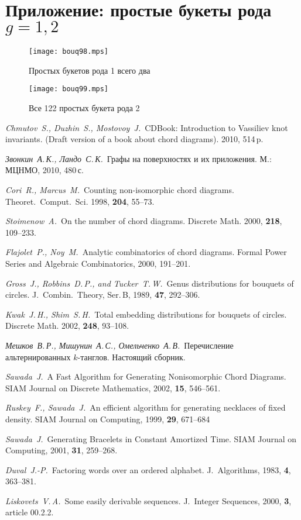 \documentclass[a4paper,12pt]{article}
\theoremstyle{plain}
\theoremstyle{definition}
\begin{document}
\section*{Приложение: простые букеты рода $g=1,2$}

\begin{figure}[ht]
\centering
\texttt{[image: bouq98.mps]}
\caption{\footnotesize Простых букетов рода 1 всего два\label{figure:simple1-table}}
\end{figure}

\begin{figure}[ht]
\centering
\texttt{[image: bouq99.mps]}
\caption{\footnotesize Все 122 простых букета рода 2\label{figure:simple2-table}}
\end{figure}

\begin{thebibliography}{88}
{\em Chmutov~S., Duzhin~S., Mostovoy~J.\,} CDBook: Introduction to Vassiliev knot invariants. (Draft version of a book about
chord diagrams). 2010, 514\,p.

{\em Звонкин~А.\,К., Ландо~С.\,К.\,} Графы на поверхностях и их приложения. М.: МЦНМО, 2010, 480\,с.

{\em Cori~R., Marcus~M.\,} Counting non-isomorphic chord diagrams. Theoret.~Comput.~Sci. 1998, {\bf204}, 55--73.

{\em Stoimenow~A.\,} On the number of chord diagrams. Discrete Math. 2000, {\bf218}, 109--233.

{\em Flajolet~P., Noy~M.\,} Analytic combinatorics of chord diagrams. Formal Power Series and Algebraic Combinatorics, 2000,
191--201.

{\em Gross~J., Robbins~D.\,P., and Tucker~T.\,W.\,} Genus distributions for bouquets of circles. J.~Combin.~Theory, Ser.\,B,
1989, {\bf47}, 292--306.

{\em Kwak~J.\,H., Shim~S.\,H.\,} Total embedding distributions for bouquets of circles. Discrete Math. 2002, {\bf248}, 93--108.

{\em Мешков~В.\,Р., Мишунин~А.\,С., Омельченко~А.\,В.\,}
Перечисление альтернированных $k$-танглов. Настоящий сборник.

{\em Sawada~J.\,} A Fast Algorithm for Generating Nonisomorphic Chord Diagrams. SIAM Journal on Discrete Mathematics, 2002,
{\bf15}, 546--561.

{\em Ruskey~F., Sawada~J.\,} An efficient algorithm for generating necklaces of fixed density. SIAM Journal on Computing, 1999,
{\bf 29}, 671--684

{\em Sawada~J.\,} Generating Bracelets in Constant Amortized Time. SIAM Journal on Computing, 2001, {\bf31}, 259--268.

{\em Duval~J.-P.\,} Factoring words over an ordered alphabet. J.~Algorithms, 1983, {\bf4}, 363--381.

{\em Liskovets~V.\,A.\,} Some easily derivable sequences. J.~Integer Sequences, 2000, {\bf3}, article 00.2.2.

\end{thebibliography}
\end{document}
